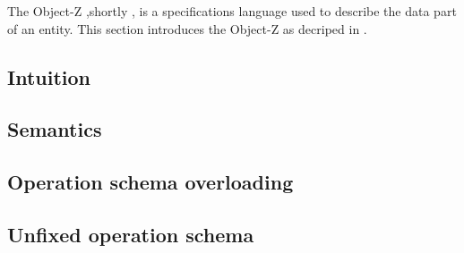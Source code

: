 The Object-Z ,shortly \oz{}, is a specifications language used to describe the data part of an entity. This section introduces the Object-Z as decriped in \cite{olderog}.
\subsection{Intuition}
\label{sec_oz_intuition}


\subsection{Semantics}
\label{sec_oz_sem}


\subsection{Operation schema overloading}
\label{overloaded_operation}


\subsection{Unfixed operation schema}
\label{unfixed_operation}
